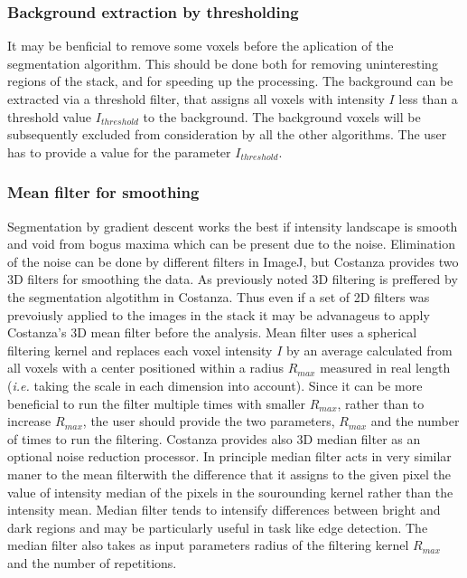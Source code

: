 \documentclass[a4paper,12pt]{article}
\begin{document}
\subsubsection{Background extraction by thresholding}

It may be benficial to remove some voxels before the aplication of the
segmentation algorithm. This should be done both for removing uninteresting regions of the
stack, and for speeding up the processing. The background can be
extracted via a threshold filter, that assigns all voxels with
intensity $I$ less than a threshold value $I_{threshold}$ to
the background. The background voxels will be subsequently excluded from consideration by all the other algorithms. The user
has to provide a value for the parameter $I_{threshold}$.

\subsubsection{Mean filter for smoothing}

Segmentation by gradient descent works the best if intensity landscape is smooth and void from bogus maxima which can be present due to the noise. Elimination of the noise can be done by different
filters in ImageJ, but Costanza provides two 3D filters for
smoothing the data. As previously noted 3D filtering is preffered by the segmentation algotithm in Costanza. Thus even if a set of 2D filters was prevoiusly applied to the images in the stack it may be advanageus to apply Costanza's 3D mean filter before the analysis. Mean filter uses a spherical filtering kernel and replaces each voxel intensity
$I$ by an average calculated from all voxels with a center positioned
within a radius $R_{max}$ measured in real length (\textit{i.e.} taking the scale in each dimension into account). Since it can be
more beneficial to run the filter multiple times with smaller $R_{max}$, rather than to increase $R_{max}$,
the user should provide the two parameters, $R_{max}$ and the number
of times to run the filtering.
Costanza provides also 3D median filter as an optional noise reduction processor. In principle median filter acts in very similar maner to the mean filterwith the difference that it assigns to the given pixel the value of intensity median of the pixels in the sourounding kernel rather than the intensity mean. Median filter tends to intensify differences between bright and dark regions and may be particularly useful in task like edge detection. The median filter also takes as input parameters radius of the filtering kernel $R_{max}$ and the number of repetitions.
\end{document}
